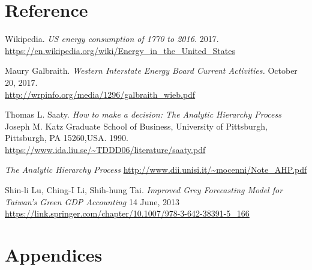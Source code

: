 \documentclass{mcmthesis}
\begin{document}
\section{Reference}
%
\begin{thebibliography}{99}

Wikipedia.  \textsl{US energy consumption of 1770 to 2016.} 2017.\\
\url{https://en.wikipedia.org/wiki/Energy_in_the_United_States}

Maury Galbraith. \textsl{Western Interstate Energy Board Current Activities.} October 20, 2017.\\ 
\url{http://wrpinfo.org/media/1296/galbraith_wieb.pdf}

Thomas L. Saaty. \textsl{How to make a decision: The Analytic Hierarchy Process} Joseph M. Katz Graduate School of Business, University of Pittsburgh, Pittsburgh, PA 15260,USA. 1990.\\
\url{https://www.ida.liu.se/~TDDD06/literature/saaty.pdf}

\textsl{The Analytic Hierarchy Process }
\url{http://www.dii.unisi.it/~mocenni/Note_AHP.pdf}

Shin-li Lu, Ching-I Li, Shih-hung Tai. \textsl{Improved Grey Forecasting Model for Taiwan’s Green GDP Accounting} 14 June, 2013
\url{https://link.springer.com/chapter/10.1007/978-3-642-38391-5_166}

\end{thebibliography}



\section{Appendices}
\begin{appendices}

\section{}

%
\section{}
%
\section{}
\end{appendices}
\end{document}
